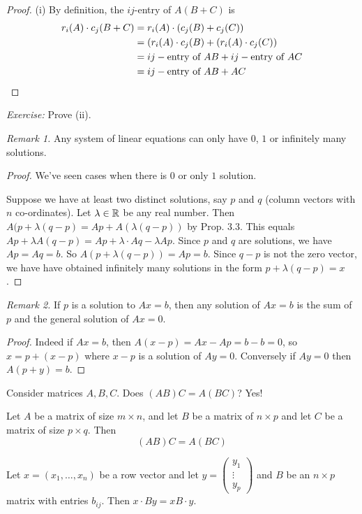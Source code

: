 \documentclass[10pt]{scrartcl}
\begin{document}
\begin{proof}
(i) By definition, the $ij$-entry of $A(B+C)$ is 
\begin{align*}
  r_i(A)\cdot c_j(B+C) &= r_i(A)\cdot(c_j(B) + c_j(C))\\
  &= (r_i(A)\cdot c_j(B) + (r_i(A)\cdot c_j(C))\\
  &= ij-\text{entry of } AB + ij-\text{entry of } AC\\
  &= ij-\text{entry of } AB + AC\qedhere
\end{align*}
\end{proof}

\emph{Exercise:} Prove (ii). 


\emph{Remark 1.} Any system of linear equations can only have $0$, $1$ or infinitely many solutions.	

\begin{proof}
	We've seen cases when there is $0$ or only $1$ solution. 
	
	Suppose we have at least two distinct solutions, say $p$ and $q$ (column vectors with $n$ co-ordinates). Let $\lambda\in\mathbb{R}$ be any real number. Then $A(p + \lambda(q-p) = Ap + A(\lambda(q-p))$ by Prop. 3.3. This equals $Ap + \lambda A(q-p) = Ap + \lambda \cdot Aq -\lambda Ap$. Since $p$ and $q$ are solutions, we have $Ap = Aq = b$. So $A(p + \lambda (q-p)) = Ap = b$. Since $q-p$ is not the zero vector, we have have obtained infinitely many solutions in the form $p + \lambda(q-p) = x$. 
\end{proof}\vsp


\emph{Remark 2.}
If $p$ is a solution to $Ax = b$, then any solution of $Ax =b$ is the sum of $p$ and the general solution of $Ax = 0$. 

\begin{proof}Indeed if $Ax = b$, then $A(x-p) = Ax - Ap = b-b=0$, so $x = p+ (x-p)$ where $x-p$ is a solution of $Ay = 0$. Conversely if $Ay =0$ then $A(p+y) = b$.	
\end{proof}


Consider matrices $A,B,C$. Does $(AB)C = A(BC)$? Yes!

\begin{theorem}
Let $A$ be a matrix of size $m \times n$, and let $B$ be a matrix of $n \times p$ and let $C$ be a matrix of size $p \times q$. Then 
\[(AB)C = A(BC)\]	
\end{theorem}

\begin{lemma}
Let $x = (x_1,\dots,x_n)$ be a row vector and let $y= \left(\begin{smallmatrix}
y_1\\\vdots \\y_p	
\end{smallmatrix}\right)$ and $B$ be an $n \times p$ matrix with entries $b_{ij}$. Then $x \cdot By = xB\cdot y$. 
\end{lemma}
\end{document}
